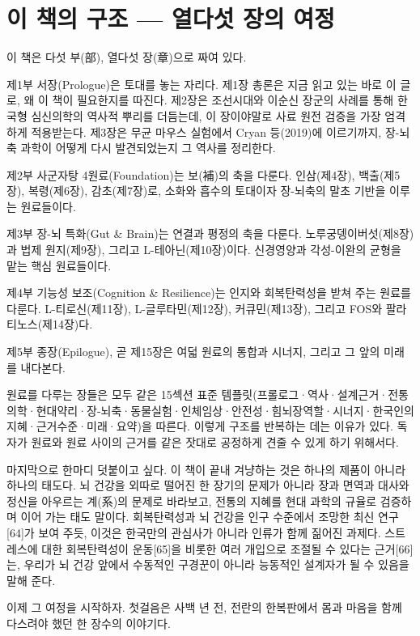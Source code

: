 \documentclass[12pt,oneside]{book}
\begin{document}
\section{이 책의 구조 — 열다섯 장의 여정}

이 책은 다섯 부(部), 열다섯 장(章)으로 짜여 있다.

제1부 서장(Prologue)은 토대를 놓는 자리다. 제1장 총론은 지금 읽고 있는 바로 이 글로, 왜 이 책이 필요한지를 따진다. 제2장은 조선시대와 이순신 장군의 사례를 통해 한국형 심신의학의 역사적 뿌리를 더듬는데, 이 장이야말로 사료 원전 검증을 가장 엄격하게 적용받는다. 제3장은 무균 마우스 실험에서 Cryan 등(2019)에 이르기까지, 장-뇌축 과학이 어떻게 다시 발견되었는지 그 역사를 정리한다.

제2부 사군자탕 4원료(Foundation)는 보(補)의 축을 다룬다. 인삼(제4장), 백출(제5장), 복령(제6장), 감초(제7장)로, 소화와 흡수의 토대이자 장-뇌축의 말초 기반을 이루는 원료들이다.

제3부 장-뇌 특화(Gut \& Brain)는 연결과 평정의 축을 다룬다. 노루궁뎅이버섯(제8장)과 법제 원지(제9장), 그리고 L-테아닌(제10장)이다. 신경영양과 각성-이완의 균형을 맡는 핵심 원료들이다.

제4부 기능성 보조(Cognition \& Resilience)는 인지와 회복탄력성을 받쳐 주는 원료를 다룬다. L-티로신(제11장), L-글루타민(제12장), 커큐민(제13장), 그리고 FOS와 팔라티노스(제14장)다.

제5부 종장(Epilogue), 곧 제15장은 여덟 원료의 통합과 시너지, 그리고 그 앞의 미래를 내다본다.

원료를 다루는 장들은 모두 같은 15섹션 표준 템플릿(프롤로그·역사·설계근거·전통의학·현대약리·장-뇌축·동물실험·인체임상·안전성·힘뇌장역할·시너지·한국인의지혜·근거수준·미래·요약)을 따른다. 이렇게 구조를 반복하는 데는 이유가 있다. 독자가 원료와 원료 사이의 근거를 같은 잣대로 공정하게 견줄 수 있게 하기 위해서다.

마지막으로 한마디 덧붙이고 싶다. 이 책이 끝내 겨냥하는 것은 하나의 제품이 아니라 하나의 태도다. 뇌 건강을 외따로 떨어진 한 장기의 문제가 아니라 장과 면역과 대사와 정신을 아우르는 계(系)의 문제로 바라보고, 전통의 지혜를 현대 과학의 규율로 검증하며 이어 가는 태도 말이다. 회복탄력성과 뇌 건강을 인구 수준에서 조망한 최신 연구[64]가 보여 주듯, 이것은 한국만의 관심사가 아니라 인류가 함께 짊어진 과제다. 스트레스에 대한 회복탄력성이 운동[65]을 비롯한 여러 개입으로 조절될 수 있다는 근거[66]는, 우리가 뇌 건강 앞에서 수동적인 구경꾼이 아니라 능동적인 설계자가 될 수 있음을 말해 준다.

이제 그 여정을 시작하자. 첫걸음은 사백 년 전, 전란의 한복판에서 몸과 마음을 함께 다스려야 했던 한 장수의 이야기다.
\end{document}
